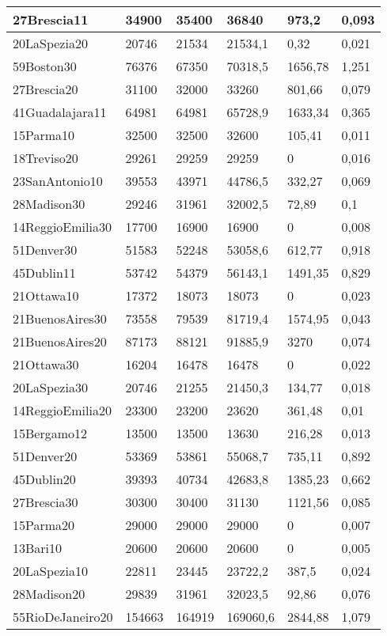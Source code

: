 \begin{longtable}[c]{|l|l|l|l|l|l|}
27Brescia11 & 34900 & 35400 & 36840 & 973,2 & 0,093 \\ \hline
20LaSpezia20 & 20746 & 21534 & 21534,1 & 0,32 & 0,021 \\ \hline
59Boston30 & 76376 & 67350 & 70318,5 & 1656,78 & 1,251 \\ \hline
27Brescia20 & 31100 & 32000 & 33260 & 801,66 & 0,079 \\ \hline
41Guadalajara11 & 64981 & 64981 & 65728,9 & 1633,34 & 0,365 \\ \hline
15Parma10 & 32500 & 32500 & 32600 & 105,41 & 0,011 \\ \hline
18Treviso20 & 29261 & 29259 & 29259 & 0 & 0,016 \\ \hline
23SanAntonio10 & 39553 & 43971 & 44786,5 & 332,27 & 0,069 \\ \hline
28Madison30 & 29246 & 31961 & 32002,5 & 72,89 & 0,1 \\ \hline
14ReggioEmilia30 & 17700 & 16900 & 16900 & 0 & 0,008 \\ \hline
51Denver30 & 51583 & 52248 & 53058,6 & 612,77 & 0,918 \\ \hline
45Dublin11 & 53742 & 54379 & 56143,1 & 1491,35 & 0,829 \\ \hline
21Ottawa10 & 17372 & 18073 & 18073 & 0 & 0,023 \\ \hline
21BuenosAires30 & 73558 & 79539 & 81719,4 & 1574,95 & 0,043 \\ \hline
21BuenosAires20 & 87173 & 88121 & 91885,9 & 3270 & 0,074 \\ \hline
21Ottawa30 & 16204 & 16478 & 16478 & 0 & 0,022 \\ \hline
20LaSpezia30 & 20746 & 21255 & 21450,3 & 134,77 & 0,018 \\ \hline
14ReggioEmilia20 & 23300 & 23200 & 23620 & 361,48 & 0,01 \\ \hline
15Bergamo12 & 13500 & 13500 & 13630 & 216,28 & 0,013 \\ \hline
51Denver20 & 53369 & 53861 & 55068,7 & 735,11 & 0,892 \\ \hline
45Dublin20 & 39393 & 40734 & 42683,8 & 1385,23 & 0,662 \\ \hline
27Brescia30 & 30300 & 30400 & 31130 & 1121,56 & 0,085 \\ \hline
15Parma20 & 29000 & 29000 & 29000 & 0 & 0,007 \\ \hline
13Bari10 & 20600 & 20600 & 20600 & 0 & 0,005 \\ \hline
20LaSpezia10 & 22811 & 23445 & 23722,2 & 387,5 & 0,024 \\ \hline
28Madison20 & 29839 & 31961 & 32023,5 & 92,86 & 0,076 \\ \hline
55RioDeJaneiro20 & 154663 & 164919 & 169060,6 & 2844,88 & 1,079 \\ \hline
\end{longtable}